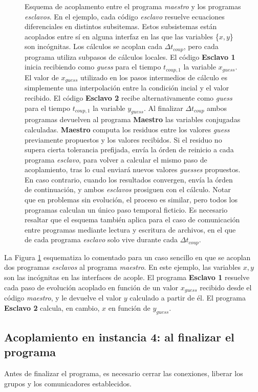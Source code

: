 \begin{figure}
\begin{tikzpicture}
\end{tikzpicture}
\caption[Esquema de acoplamiento implementado]{Esquema de acoplamento entre el programa \textit{maestro} y los programas \textit{esclavos}.
En el ejemplo, cada código \textit{esclavo} resuelve ecuaciones diferenciales en distintos subsitemas.
Estos subsistemas están acoplados entre sí en alguna interfaz en las que las variables \{$x,y$\} son incógnitas.
Los cálculos se acoplan cada $\Delta t_{coup}$, pero cada programa utiliza subpasos de cálculos locales.
El código \textbf{Esclavo 1} inicia recibiendo como \textit{guess} para el tiempo $t_{coup,1}$ la variable $x_{guess}$.
El valor de $x_{guess}$ utilizado en los pasos intermedios de cálculo es simplemente una interpolación entre la condición incial y el valor recibido.
El código \textbf{Esclavo 2} recibe alternativamente como \textit{guess} para el tiempo $t_{coup,1}$ la variable $y_{guess}$.
Al finalizar $\Delta t_{coup}$ ambos programas devuelven al programa \textbf{Maestro} las variables conjugadas calculadas.
\textbf{Maestro} computa los residuos entre los valores \textit{guess} previamente propuestos y los valores recibidos.
Si el residuo no supera cierta tolerancia prefijada, envía la órden de reinicio a cada programa \textit{esclavo}, 
para volver a calcular el mismo paso de acoplamiento, tras lo cual enviará nuevos valores \textit{guesses} propuestos.
En caso contrario, cuando los resultados convergen, envía la órden de continuación, y ambos \textit{esclavos} prosiguen con el cálculo.
Notar que en problemas sin evolución, el proceso es similar, pero todos los programas calculan un único paso temporal ficticio.
Es necesario resaltar que el esquema también aplica para el caso de comunicación entre programas mediante lectura y escritura de archivos, en el que de cada programa \textit{esclavo} solo vive durante cada $\Delta t_{coup}$.
}
\label{esquema-evolucion}
\end{figure}

La Figura \ref{esquema-evolucion} esquematiza lo comentado para un caso sencillo en que se acoplan dos programas \textit{esclavos} al programa \textit{maestro}.
En este ejemplo, las variables $x,y$ son las incógnitas en las interfaces de acople.
El programa \textbf{Esclavo 1} resuelve cada paso de evolución acoplado en función de un valor $x_{guess}$ recibido desde el código \textit{maestro}, y le devuelve el valor $y$ calculado a partir de él.
El programa \textbf{Esclavo 2} calcula, en cambio, $x$ en función de $y_{guess}$.

\subsection*{Acoplamiento en instancia 4: al finalizar el programa}

Antes de finalizar el programa, es necesario cerrar las conexiones, liberar los grupos y los comunicadores establecidos.
